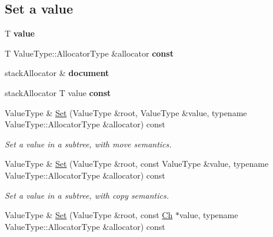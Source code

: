 \subsection*{Set a value}
\begin{DoxyCompactItemize}
\item 
T {\bfseries value}\hypertarget{class_generic_pointer_a08ef35da0ea9a51d8265a360f0c34540}{}\label{class_generic_pointer_a08ef35da0ea9a51d8265a360f0c34540}

\item 
T Value\+Type\+::\+Allocator\+Type \&allocator {\bfseries const}
\item 
stack\+Allocator \& {\bfseries document}\hypertarget{class_generic_pointer_afd073c4e3be53fd7ec08aec9f75fbaa9}{}\label{class_generic_pointer_afd073c4e3be53fd7ec08aec9f75fbaa9}

\item 
stack\+Allocator T value {\bfseries const}
\item 
Value\+Type \& \hyperlink{class_generic_pointer_adf0aa776e072b41d301e2a834ac2c2b5}{Set} (Value\+Type \&root, Value\+Type \&value, typename Value\+Type\+::\+Allocator\+Type \&allocator) const 
\begin{DoxyCompactList}\small\item\em Set a value in a subtree, with move semantics. \end{DoxyCompactList}\item 
Value\+Type \& \hyperlink{class_generic_pointer_a80ceefa779d8d8e4699c433eb40ef1fa}{Set} (Value\+Type \&root, const Value\+Type \&value, typename Value\+Type\+::\+Allocator\+Type \&allocator) const \hypertarget{class_generic_pointer_a80ceefa779d8d8e4699c433eb40ef1fa}{}\label{class_generic_pointer_a80ceefa779d8d8e4699c433eb40ef1fa}

\begin{DoxyCompactList}\small\item\em Set a value in a subtree, with copy semantics. \end{DoxyCompactList}\item 
Value\+Type \& \hyperlink{class_generic_pointer_ae62ceea598633d21ad648b431b23c26a}{Set} (Value\+Type \&root, const \hyperlink{class_generic_pointer_a38b73c84d37428340066d907f9d4f37f}{Ch} $\ast$value, typename Value\+Type\+::\+Allocator\+Type \&allocator) const \hypertarget{class_generic_pointer_ae62ceea598633d21ad648b431b23c26a}{}\label{class_generic_pointer_ae62ceea598633d21ad648b431b23c26a}


\end{DoxyCompactItemize}
